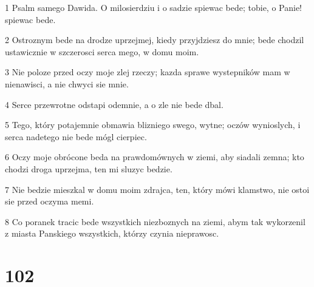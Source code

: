 \par 1 Psalm samego Dawida. O milosierdziu i o sadzie spiewac bede; tobie, o Panie! spiewac bede.
\par 2 Ostroznym bede na drodze uprzejmej, kiedy przyjdziesz do mnie; bede chodzil ustawicznie w szczerosci serca mego, w domu moim.
\par 3 Nie poloze przed oczy moje zlej rzeczy; kazda sprawe wystepników mam w nienawisci, a nie chwyci sie mnie.
\par 4 Serce przewrotne odstapi odemnie, a o zle nie bede dbal.
\par 5 Tego, który potajemnie obmawia blizniego swego, wytne; oczów wynioslych, i serca nadetego nie bede mógl cierpiec.
\par 6 Oczy moje obrócone beda na prawdomównych w ziemi, aby siadali zemna; kto chodzi droga uprzejma, ten mi sluzyc bedzie.
\par 7 Nie bedzie mieszkal w domu moim zdrajca, ten, który mówi klamstwo, nie ostoi sie przed oczyma memi.
\par 8 Co poranek tracic bede wszystkich niezboznych na ziemi, abym tak wykorzenil z miasta Panskiego wszystkich, którzy czynia nieprawosc.

\chapter{102}

